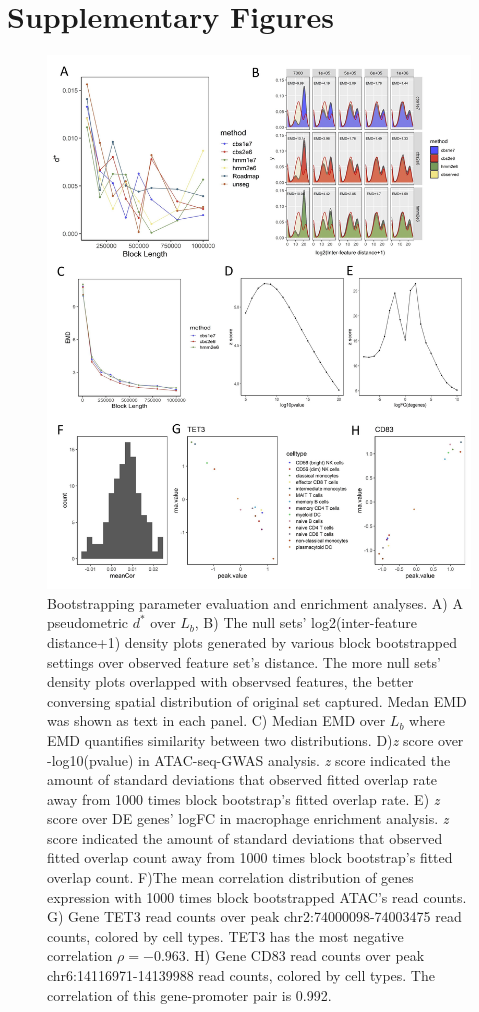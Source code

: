 \documentclass{article}
\begin{document}
\section{Supplementary Figures}
\begin{figure}[t]
\centering
\includegraphics[scale=0.8]{Figures/sfig.jpg}
\caption{Bootstrapping parameter evaluation and enrichment analyses. A) A pseudometric $d^*$ over $L_b$, B) The null sets' log2(inter-feature distance+1) density plots generated by various block bootstrapped settings over observed feature set's distance. The more null sets' density plots overlapped with observsed features, the better conversing spatial distribution of original set captured. Medan EMD was shown as text in each panel. C) Median EMD over $L_b$ where EMD quantifies similarity between two distributions. D)\textit{z} score over -log10(pvalue) in ATAC-seq-GWAS analysis. \textit{z} score indicated the amount of standard deviations that observed fitted overlap rate away from 1000 times block bootstrap's fitted overlap rate. E) \textit{z} score over DE genes' logFC in macrophage enrichment analysis. \textit{z} score indicated the amount of standard deviations that observed fitted overlap count away from 1000 times block bootstrap's fitted overlap count. F)The mean correlation distribution of genes expression with 1000 times block bootstrapped ATAC's read counts. G) Gene TET3 read counts over peak chr2:74000098-74003475 read counts, colored by cell types. TET3 has the most negative correlation $\rho = −0.963$. H) Gene CD83 read counts over peak chr6:14116971-14139988 read counts, colored by cell types. The correlation of this gene-promoter pair is 0.992.} 
\label{fig:suppfig}
\end{figure}


%
%
%
%
%
%
%

\end{document}
